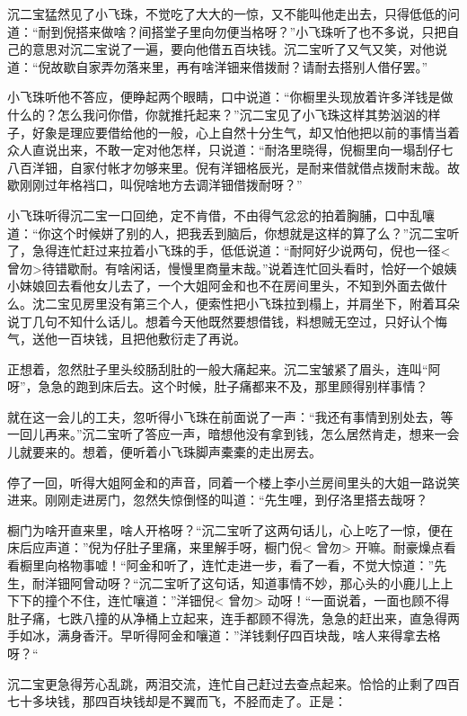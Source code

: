 \documentclass[12pt,UTF8]{ctexbook}
\begin{document}
{{{沉二宝猛然见了小飞珠，不觉吃了大大的一惊，又不能叫他走出去，只得低低的问道：“耐到倪搭来做啥？间搭堂子里向勿便当格呀？”小飞珠听了也不多说，只把自己的意思对沉二宝说了一遍，要向他借五百块钱。沉二宝听了又气又笑，对他说道：“倪故歇自家弄勿落来里，再有啥洋钿来借拨耐？请耐去搭别人借仔罢。”

小飞珠听他不答应，便睁起两个眼睛，口中说道：“你橱里头现放着许多洋钱是做什么的？怎么我问你借，你就推托起来？”沉二宝见了小飞珠这样其势汹汹的样子，好象是理应要借给他的一般，心上自然十分生气，却又怕他把以前的事情当着众人直说出来，不敢一定对他怎样，只说道：“耐洛里晓得，倪橱里向一塌刮仔七八百洋钿，自家付帐才勿够来里。倪有洋钿格辰光，是耐来借就借点拨耐末哉。故歇刚刚过年格裆口，叫倪啥地方去调洋钿借拨耐呀？”

小飞珠听得沉二宝一口回绝，定不肯借，不由得气忿忿的拍着胸脯，口中乱嚷道：“你这个时候姘了别的人，把我丢到脑后，你想就是这样的算了么？”沉二宝听了，急得连忙赶过来拉着小飞珠的手，低低说道：“耐阿好少说两句，倪也一径<曾勿>待错歇耐。有啥闲话，慢慢里商量末哉。”说着连忙回头看时，恰好一个娘姨小妹娘回去看他女儿去了，一个大姐阿金和也不在房间里头，不知到外面去做什么。沈二宝见房里没有第三个人，便索性把小飞珠拉到榻上，并肩坐下，附着耳朵说丁几句不知什么话儿。想着今天他既然要想借钱，料想贼无空过，只好认个悔气，送他一百块钱，且把他敷衍走了再说。

正想着，忽然肚子里头绞肠刮肚的一般大痛起来。沉二宝皱紧了眉头，连叫“阿呀”，急急的跑到床后去。这个时候，肚子痛都来不及，那里顾得别样事情？

就在这一会儿的工夫，忽听得小飞珠在前面说了一声：“我还有事情到别处去，等一回儿再来。”沉二宝听了答应一声，暗想他没有拿到钱，怎么居然肯走，想来一会儿就要来的。想着，便听着小飞珠脚声橐橐的走出房去。

停了一回，听得大姐阿金和的声音，同着一个楼上李小兰房间里头的大姐一路说笑进来。刚刚走进房门，忽然失惊倒怪的叫道：“先生哩，到仔洛里搭去哉呀？

橱门为啥开直来里，啥人开格呀？“沉二宝听了这两句话儿，心上吃了一惊，便在床后应声道：”倪为仔肚子里痛，来里解手呀，橱门倪< 曾勿> 开嘛。耐豪燥点看看橱里向格物事嘘！“阿金和听了，连忙走进一步，看了一看，不觉大惊道：”先生，耐洋钿阿曾动呀？“沉二宝听了这句话，知道事情不妙，那心头的小鹿儿上上下下的撞个不住，连忙嚷道：”洋钿倪< 曾勿> 动呀！“一面说着，一面也顾不得肚子痛，七跌八撞的从净桶上立起来，连手都顾不得洗，急急的赶出来，直急得两手如冰，满身香汗。早听得阿金和嚷道：”洋钱剩仔四百块哉，啥人来得拿去格呀？“

沉二宝更急得芳心乱跳，两泪交流，连忙自己赶过去查点起来。恰恰的止剩了四百七十多块钱，那四百块钱却是不翼而飞，不胫而走了。正是：

}}}
\end{document}
